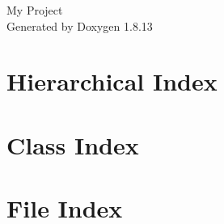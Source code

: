 \documentclass[twoside]{book}
\newcommand{\+}{\discretionary{\mbox{\scriptsize$\hookleftarrow$}}{}{}}
\newcommand{\clearemptydoublepage}{%
  \newpage{\pagestyle{empty}\cleardoublepage}%
}
\begin{document}
\hypersetup{pageanchor=false,
             bookmarksnumbered=true,
             pdfencoding=unicode
            }
\begin{titlepage}
\vspace*{7cm}
\begin{center}%
{\Large My Project }\\
\vspace*{1cm}
{\large Generated by Doxygen 1.8.13}\\
\end{center}
\end{titlepage}
\clearemptydoublepage
{}
\tableofcontents
\clearemptydoublepage
{}
\hypersetup{pageanchor=true}

\chapter{Hierarchical Index}

\chapter{Class Index}

\chapter{File Index}

\end{document}
